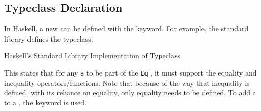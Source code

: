 \subsection{Typeclass Declaration}\label{subsec:Typeclass_Declaration}
In Haskell, a new  can be defined with the  keyword.
For example, the standard library defines the  typeclass.

\begin{listing}[h!tbp]
\caption{Haskell's Standard Library Implementation of  Typeclass}
\label{lst:Eq_Typeclass_Definition}
\end{listing}

This states that for any  \texttt{a} to be part of the \texttt{Eq} , it must support the equality and inequality operators/functions.
Note that because of the way that inequality is defined, with its reliance on equality, only equality needs to be defined.
To add a  to a , the  keyword is used.


